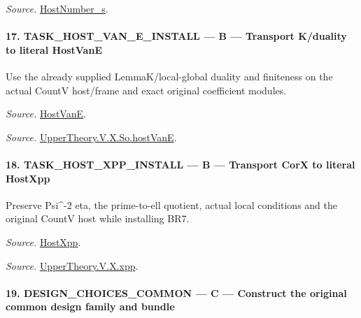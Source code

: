 \documentclass[11pt,a4paper]{article}
\numberwithin{equation}{section}
\theoremstyle{remark}\newtheorem{remark}[theorem]{Remark}
\begin{document}
\emph{Source.} \href{https://github.com/CocoSgt/riemann-hypothesis-lean/blob/7cbf7a0c32fca1badf05931879a37c3f8a2b03b4/src/Development/AutomorphicArithmetic/AutomorphicVarieties/ModularityArgument/ThresholdArguments/DenseThresholdCases/HostNumberS.lean#L18-L28}{HostNumber\_\allowbreak s}.



\paragraph{17. TASK\_\allowbreak HOST\_\allowbreak VAN\_\allowbreak E\_\allowbreak INSTALL — B — Transport K/duality to literal HostVanE}

Use the already supplied LemmaK/local-global duality and finiteness on the actual CountV host/frame and exact original coefficient modules.

\emph{Source.} \href{https://github.com/CocoSgt/riemann-hypothesis-lean/blob/7cbf7a0c32fca1badf05931879a37c3f8a2b03b4/src/Development/AutomorphicArithmetic/AutomorphicVarieties/UnitaryThreeDeformations/HostNumber.lean#L9-L12}{HostVanE}.

\emph{Source.} \href{https://github.com/CocoSgt/riemann-hypothesis-lean/blob/7cbf7a0c32fca1badf05931879a37c3f8a2b03b4/src/Development/AutomorphicArithmetic/AutomorphicVarieties/LevelCohomology/SoHostVanE.lean#L11-L18}{UpperTheory.V.X.So.hostVanE}.



\paragraph{18. TASK\_\allowbreak HOST\_\allowbreak XPP\_\allowbreak INSTALL — B — Transport CorX to literal HostXpp}

Preserve Psi\textasciicircum{}-2 eta, the prime-to-ell quotient, actual local conditions and the original CountV host while installing BR7.

\emph{Source.} \href{https://github.com/CocoSgt/riemann-hypothesis-lean/blob/7cbf7a0c32fca1badf05931879a37c3f8a2b03b4/src/Development/AutomorphicArithmetic/AutomorphicVarieties/UnitaryThreeDeformations/HostNumber.lean#L14-L17}{HostXpp}.

\emph{Source.} \href{https://github.com/CocoSgt/riemann-hypothesis-lean/blob/7cbf7a0c32fca1badf05931879a37c3f8a2b03b4/src/Development/AutomorphicArithmetic/AutomorphicVarieties/LevelCohomology/Xpp.lean#L11-L84}{UpperTheory.V.X.xpp}.



\paragraph{19. DESIGN\_\allowbreak CHOICES\_\allowbreak COMMON — C — Construct the original common design family and bundle}
\end{document}
